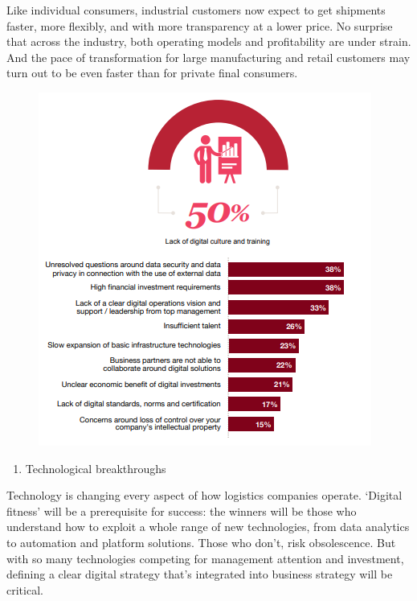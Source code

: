 \documentclass[]{book}
\providecommand{\tightlist}{%
  \setlength{\itemsep}{0pt}\setlength{\parskip}{0pt}}
\begin{document}
Like individual consumers, industrial customers now expect to get
shipments faster, more flexibly, and with more transparency at a lower
price. No surprise that across the industry, both operating models and
profitability are under strain. And the pace of transformation for large
manufacturing and retail customers may turn out to be even faster than
for private final consumers.

\begin{figure}
\centering
\includegraphics{pwc1.PNG}
\caption{}
\end{figure}

\begin{enumerate}
\def\labelenumi{\arabic{enumi}.}
\setcounter{enumi}{1}
\tightlist
\item
  Technological breakthroughs
\end{enumerate}

Technology is changing every aspect of how logistics companies operate.
`Digital fitness' will be a prerequisite for success: the winners will
be those who understand how to exploit a whole range of new
technologies, from data analytics to automation and platform solutions.
Those who don't, risk obsolescence. But with so many technologies
competing for management attention and investment, defining a clear
digital strategy that's integrated into business strategy will be
critical.
\end{document}
